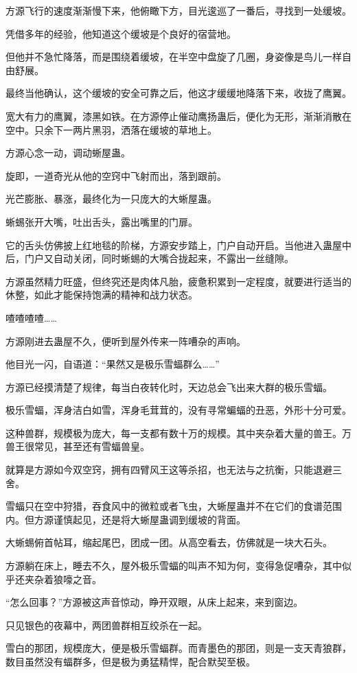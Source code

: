 \begin{this_body}
方源飞行的速度渐渐慢下来，他俯瞰下方，目光逡巡了一番后，寻找到一处缓坡。

凭借多年的经验，他知道这个缓坡是个良好的宿营地。

但他并不急忙降落，而是围绕着缓坡，在半空中盘旋了几圈，身姿像是鸟儿一样自由舒展。

最终当他确认，这个缓坡的安全可靠之后，他这才缓缓地降落下来，收拢了鹰翼。

宽大有力的鹰翼，漆黑如铁。在方源停止催动鹰扬蛊后，便化为无形，渐渐消散在空中。只余下一两片黑羽，洒落在缓坡的草地上。

方源心念一动，调动蜥屋蛊。

旋即，一道奇光从他的空窍中飞射而出，落到跟前。

光芒膨胀、暴涨，最终化为一只庞大的大蜥屋蛊。

蜥蜴张开大嘴，吐出舌头，露出嘴里的门扉。

它的舌头仿佛披上红地毯的阶梯，方源安步踏上，门户自动开启。当他进入蛊屋中后，门户又自动关闭，同时蜥蜴的大嘴合拢起来，不露出一丝缝隙。

方源虽然精力旺盛，但终究还是肉体凡胎，疲惫积累到一定程度，就要进行适当的休整，如此才能保持饱满的精神和战力状态。

喳喳喳喳……

方源刚进去蛊屋不久，便听到屋外传来一阵嘈杂的声响。

他目光一闪，自语道：“果然又是极乐雪蝠群么……”

方源已经摸清楚了规律，每当白夜转化时，天边总会飞出来大群的极乐雪蝠。

极乐雪蝠，浑身洁白如雪，浑身毛茸茸的，没有寻常蝙蝠的丑恶，外形十分可爱。

这种兽群，规模极为庞大，每一支都有数十万的规模。其中夹杂着大量的兽王。万兽王很常见，甚至还有雪蝠兽皇。

就算是方源如今双空窍，拥有四臂风王这等杀招，也无法与之抗衡，只能退避三舍。

雪蝠只在空中狩猎，吞食风中的微粒或者飞虫，大蜥屋蛊并不在它们的食谱范围内。但方源谨慎起见，还是将大蜥屋蛊调到缓坡的背面。

大蜥蜴俯首帖耳，缩起尾巴，团成一团。从高空看去，仿佛就是一块大石头。

方源躺在床上，睡去不久，屋外极乐雪蝠的叫声不知为何，变得急促嘈杂，其中似乎还夹杂着狼嚎之音。

“怎么回事？”方源被这声音惊动，睁开双眼，从床上起来，来到窗边。

只见银色的夜幕中，两团兽群相互绞杀在一起。

雪白的那团，规模庞大，便是极乐雪蝠群。而青墨色的那团，则是一支天青狼群，数目虽然没有蝠群多，但是极为勇猛精悍，配合默契至极。


\end{this_body}
